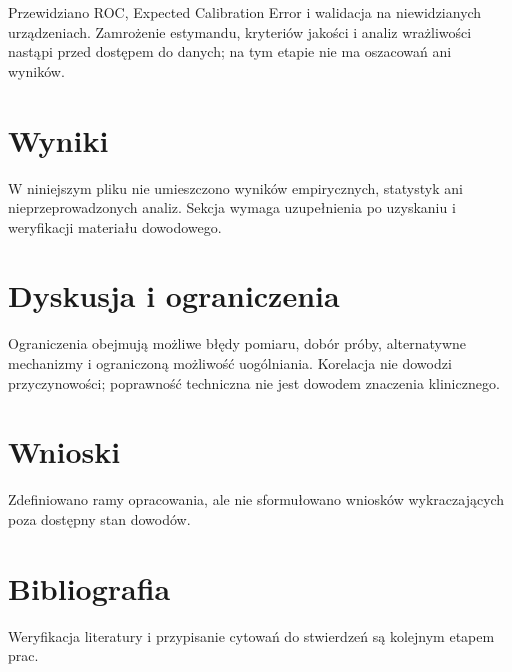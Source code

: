 \documentclass[11pt,a4paper]{article}
\begin{document}
Przewidziano ROC, Expected Calibration Error i walidacja na niewidzianych urządzeniach. Zamrożenie estymandu, kryteriów jakości i analiz wrażliwości nastąpi przed dostępem do danych; na tym etapie nie ma oszacowań ani wyników.

\section{Wyniki}

W niniejszym pliku nie umieszczono wyników empirycznych, statystyk ani nieprzeprowadzonych analiz. Sekcja wymaga uzupełnienia po uzyskaniu i weryfikacji materiału dowodowego.

\section{Dyskusja i ograniczenia}

Ograniczenia obejmują możliwe błędy pomiaru, dobór próby, alternatywne mechanizmy i ograniczoną możliwość uogólniania. Korelacja nie dowodzi przyczynowości; poprawność techniczna nie jest dowodem znaczenia klinicznego.

\section{Wnioski}

Zdefiniowano ramy opracowania, ale nie sformułowano wniosków wykraczających poza dostępny stan dowodów.

\section*{Bibliografia}

Weryfikacja literatury i przypisanie cytowań do stwierdzeń są kolejnym etapem prac.
\end{document}
